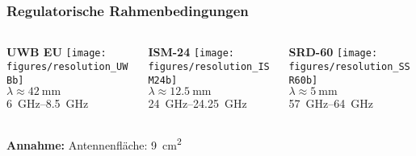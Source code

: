 \documentclass[16pt]{beamer}
\begin{document}
\begin{frame}
\frametitle{Regulatorische Rahmenbedingungen} 
\begin{columns}
	\begin{column}{4cm}
		\begin{center} 
			\textbf{UWB EU}
			\texttt{[image: figures/resolution\_UWBb]} \\
			$\lambda \approx \SI{42}{\milli\meter}$ \\
			\SIrange[range-phrase = --,range-units = single]{6}{8,5}{\giga\hertz}
		\end{center}
	\end{column}
	\begin{column}{4cm}
		\begin{center} 
			\textbf{ISM-24}
			\texttt{[image: figures/resolution\_ISM24b]} \\
			$\lambda \approx \SI{12,5}{\milli\meter}$ \\
			\SIrange[range-phrase = --,range-units = single]{24}{24,25}{\giga\hertz}
		\end{center}
	\end{column}
	\begin{column}{4cm}
		\begin{center} 
			\textbf{SRD-60}
			\texttt{[image: figures/resolution\_SSR60b]} \\
			$\lambda \approx \SI{5}{\milli\meter}$ \\
			\SIrange[range-phrase = --,range-units = single]{57}{64}{\giga\hertz}
		\end{center}
	\end{column}	
\end{columns}
\vspace{1cm}
\footnotesize \textbf{Annahme:} Antennenfläche: \SI{9}{\centi\meter\squared}
\end{frame}
\end{document}
